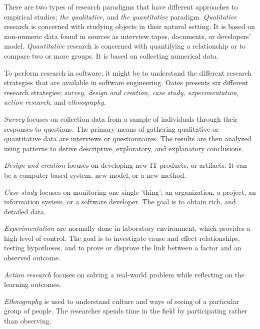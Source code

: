 There are two types of research paradigms that have different approaches to empirical studies\cite{Wohlin:2000:ESE:330775}; \textit{the qualitative}, and \textit{the quantitative} paradigm. \textit{Qualitative} research is concerned with studying objects in their natural setting\cite{Wohlin:2000:ESE:330775}. It is based on non-numeric data found in sources as interview tapes, documents, or developers' model. \textit{Quantitative} research is concerned with quantifying a relationship or to compare two or more groups\cite{Wohlin:2000:ESE:330775}. It is based on collecting numerical data. 


To perform research in software, it might be to understand the different research strategies that are available in software engineering. Oates\cite{Oates:2006:RIS:1202299} presents six different research strategies; \textit{survey, design and creation, case study, experimentation, action research}, and \textit{ethnography}. 

\textit{{Survey}} focuses on collection data from a sample of individuals through their responses to questions. The primary means of gathering qualitative or quantitative data are interviews or questionnaires. The results are then analyzed using patterns to derive descriptive, exploratory, and explanatory conclusions. 

\textit{{Design and creation}} focuses on developing new IT products, or artifacts. It can be a computer-based system, new model, or a new method. 

\textit{{Case study}} focuses on monitoring one single 'thing'; an organization, a project, an information system, or a software developer. The goal is to obtain rich, and detailed data. 

\textit{{Experimentation}} are normally done in laboratory environment, which provides a high level of control. The goal is to investigate cause and effect relationships, testing hypotheses, and to prove or disprove the link between a factor and an observed outcome. 

\textit{{Action research}} focuses on solving a real-world problem while reflecting on the learning outcomes. 

\textit{{Ethnography}} is used to understand culture and ways of seeing of a particular group of people. The researcher spends time in the field by participating rather than observing.





